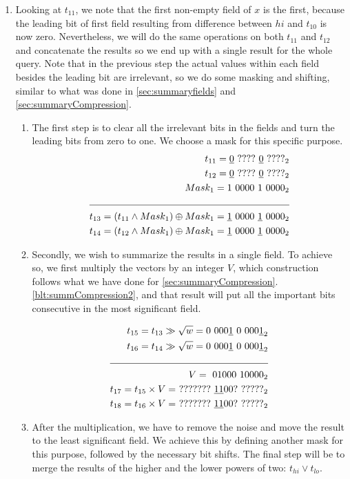 \begin{enumerate}
    \item \label{blt:parallel4}
    Looking at $t_{11}$, we note that the first non-empty field of $x$ is the first, because the leading bit of first field resulting from difference between $hi$ and $t_{10}$ is now zero. Nevertheless,  we will do the same operations on both $t_{11}$ and $t_{12}$ and concatenate the results so we end up with a single result for the whole query. Note that in the previous step the actual values within each field besides the leading bit are irrelevant, so we do some masking and shifting, similar to what was done in \ref{sec:summaryfields} and \ref{sec:summaryCompression}.
    \begin{enumerate}
        \item
        The first step is to clear all the irrelevant bits in the fields and turn the leading bits from zero to one. We choose a mask for this specific purpose.
        \begin{align*}
            t_{11} = \underline{0}\ ????\ \underline{0}\ ????_2&\\
            t_{12} = \underline{0}\ ????\ \underline{0}\ ????_2&\\
            Mask_1 = 1\ 0000\ 1\ 0000_2&\\ \cline{1-2}
            t_{13} = (t_{11} \wedge Mask_1) \oplus Mask_1 = \underline{1}\ 0000\ \underline{1}\ 0000_2&\\
            t_{14} = (t_{12} \wedge Mask_1) \oplus Mask_1 = \underline{1}\ 0000\ \underline{1}\ 0000_2&
        \end{align*}
        \item
        Secondly, we wish to summarize the results in a single field. To achieve so, we first multiply the vectors by an integer $V$, which construction follows what we have done for \ref{sec:summaryCompression}.\ref{blt:summCompression2}, and that result will put all the important bits consecutive in the most significant field.
        
        \begin{align*}
            t_{15} = t_{13} \gg \sqrt{w} = 0\ 000\underline{1}\ 0\ 000\underline{1}_2& \\
            t_{16} = t_{14} \gg \sqrt{w} = 0\ 000\underline{1}\ 0\ 000\underline{1}_2& \\
            \cline{1-2}
            V =\ 01000\ 10000_2 & \\
            t_{17} = t_{15} \times V =\ ???????\ \underline{11}00?\ ?????_2& \\
            t_{18} = t_{16} \times V =\ ???????\ \underline{11}00?\ ?????_2& \\
        \end{align*}
        \item
        After the multiplication, we have to remove the noise and move the result to the least significant field. We achieve this by defining another mask for this purpose, followed by the necessary bit shifts. The final step will be to merge the results of the higher and the lower powers of two: $t_{hi} \vee t_{lo}$.
        

\end{enumerate}
\end{enumerate}
